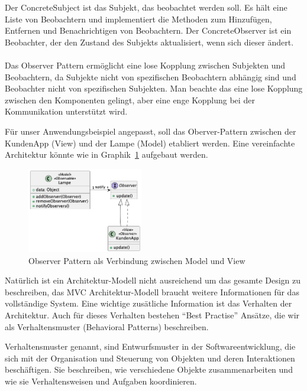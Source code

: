 Der ConcreteSubject ist das Subjekt, das beobachtet werden soll. Es hält eine Liste von Beobachtern und implementiert die Methoden zum Hinzufügen, Entfernen und Benachrichtigen von Beobachtern. Der ConcreteObserver ist ein Beobachter, der den Zustand des Subjekts aktualisiert, wenn sich dieser ändert.
\\\\
Das Observer Pattern ermöglicht eine lose Kopplung zwischen Subjekten und Beobachtern, da Subjekte nicht von spezifischen Beobachtern abhängig sind und Beobachter nicht von spezifischen Subjekten. Man beachte das eine lose Kopplung zwischen den Komponenten gelingt, aber eine enge Kopplung bei der Kommunikation unterstützt wird. 

Für unser Anwendungsbeispiel angepasst, soll das Oberver-Pattern zwischen der KundenApp (View) und der Lampe (Model) etabliert werden. Eine vereinfachte Architektur könnte wie in Graphik~\ref{fig:mvc-observer} aufgebaut werden. 

\begin{figure}[ht]
  \centering
  \includegraphics[width=0.45\textwidth]{fig/uml/mvc-observer.png}
  \caption{Observer Pattern als Verbindung zwischen Model und View}
  \label{fig:mvc-observer}
\end{figure}

Natürlich ist ein Architektur-Modell nicht ausreichend um das gesamte Design zu beschreiben, das MVC Architektur-Modell braucht weitere Informationen für das vollständige System. Eine wichtige zusätliche Information ist das Verhalten der Architektur. Auch für dieses Verhalten bestehen \enquote{Best Practise} Ansätze, die wir als Verhaltensmuster (Behavioral Patterns) beschreiben. 

Verhaltensmuster genannt, sind Entwurfsmuster in der Softwareentwicklung, die sich mit der Organisation und Steuerung von Objekten und deren Interaktionen beschäftigen. Sie beschreiben, wie verschiedene Objekte zusammenarbeiten und wie sie Verhaltensweisen und Aufgaben koordinieren.

